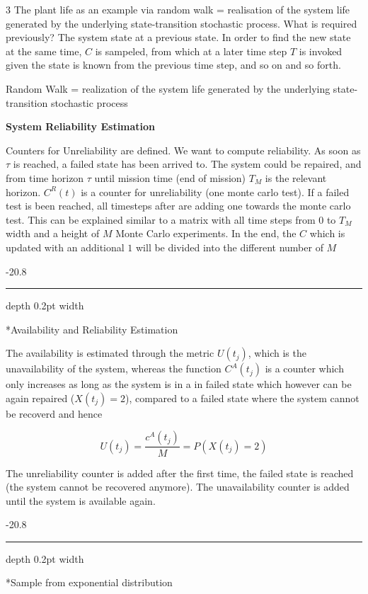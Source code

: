 \documentclass[8pt, landscape, fleqn]{scrartcl}
\makeatletter
\renewcommand{\subsubsection}{\@startsection{subsubsection}{1}{0mm}%
{-2\baselineskip}{0.8\baselineskip}%
{\hrule depth 0.2pt width\columnwidth\vspace*{1.2em}\normalsize\bfseries\rmfamily}}
\makeatother
\begin{document}
\begin{multicols*}{3}
The plant life as an example via random walk = realisation of the system life generated by the underlying state-transition stochastic process. What is required previously? The system state at a previous state. In order to find the new state at the same time, $C$ is sampeled, from which at a later time step $T$ is invoked given the state is known from the previous time step, and so on and so forth. \newline

Random Walk = realization of the system life generated by the underlying state-transition stochastic process \newline

\textbf{System Reliability Estimation}

Counters for Unreliability are defined. We want to compute reliability. As soon as $\tau$ is reached, a failed state has been arrived to. The system could be repaired, and from time horizon $\tau$ until mission time (end of mission) $T_M$ is the relevant horizon. $C^R(t)$ is a counter for unreliability (one monte carlo test). If a failed test is been reached, all timesteps after are adding one towards the monte carlo test. This can be explained similar to a matrix with all time steps from $0$ to $T_M$ width and a height of $M$ Monte Carlo experiments. In the end, the $C$ which is updated with an additional $1$ will be divided into the different number of $M$   


\subsubsection*{Availability and Reliability Estimation}

The availability is estimated through the metric $U(t_j)$, which is the unavailability of the system, whereas the function $C^A(t_j)$ is a counter which only increases as long as the system is in a in failed state which however can be again repaired ($X(t_j) =2$), compared to a failed state where the system cannot be recoverd and hence 

\begin{equation}
    U(t_j) = \frac{c^A(t_j)}{M} = P(X(t_j) = 2)
\end{equation} 

The unreliability counter is added after the first time, the failed state is reached (the system cannot be recovered anymore). The unavailability counter is added until the system is available again.

\subsubsection*{Sample from exponential distribution}


\end{multicols*}
\end{document}
